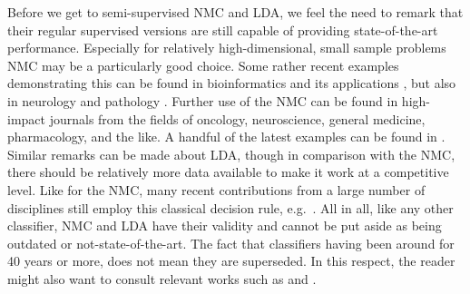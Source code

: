 \documentclass[twoside]{memoir}\usepackage[]{graphicx}\usepackage{xcolor}
\renewcommand{\cite}{\citep}
\begin{document}
Before we get to semi-supervised NMC and LDA, we feel the need to remark that their regular supervised versions are still capable of providing state-of-the-art performance. Especially for relatively high-dimensional, small sample problems NMC may be a particularly good choice.  Some rather recent examples demonstrating this can be found in bioinformatics and its applications \cite{wilkerson2012differential,villamil2012colon,budczies2012remodeling}, but also in neurology \cite{jolij2011act} and pathology \cite{gazinska2013comparison}. Further use of the NMC can be found in high-impact journals from the fields of oncology, neuroscience, general medicine, pharmacology, and the like.  A handful of the latest examples can be found in \cite{hyde2012mnemonic,haibe2012three,desmet2013identification,sjodahl2012molecular}.  Similar remarks can be made about LDA, though in comparison with the NMC, there should be relatively more data available to make it work at a competitive level.  Like for the NMC, many recent contributions from a large number of disciplines still employ this classical decision rule, e.g.\ \cite{ackermann2013detection,allen2013network,chung2013single,brunton2013rats,price2012cyanophora}.  All in all, like any other classifier, NMC and LDA have their validity and cannot be put aside as being outdated or not-state-of-the-art. The fact that classifiers having been around for 40 years or more, does not mean they are superseded.  In this respect, the reader might also want to consult relevant works such as \cite{Hand2006a} and \cite{efronXXX}.
\end{document}
